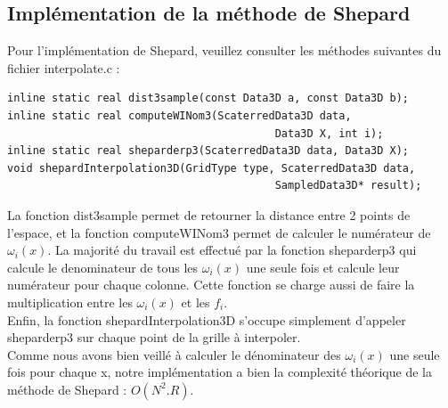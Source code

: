 \documentclass[a4paper,9pt]{article}
\begin{document}
\subsection{Implémentation de la méthode de Shepard}
\label{subsec:shepard_implementation}
Pour l'implémentation de Shepard, veuillez consulter les méthodes suivantes du fichier interpolate.c :
\begin{verbatim}
inline static real dist3sample(const Data3D a, const Data3D b);
inline static real computeWINom3(ScaterredData3D data, 
                                          Data3D X, int i);
inline static real sheparderp3(ScaterredData3D data, Data3D X);
void shepardInterpolation3D(GridType type, ScaterredData3D data,
                                          SampledData3D* result);
\end{verbatim}
La fonction dist3sample permet de retourner la distance entre 2 points de l'espace, et la fonction computeWINom3 permet de calculer le numérateur de $\omega_{i}(x)$. La majorité du travail est effectué par la fonction sheparderp3 qui calcule le denominateur de tous les $\omega_{i}(x)$ une seule fois et calcule leur numérateur pour chaque colonne. Cette fonction se charge aussi de faire la multiplication entre les $\omega_{i}(x)$ et les $f_{i}$.\\Enfin, la fonction shepardInterpolation3D s'occupe simplement d'appeler sheparderp3 sur chaque point de la grille à interpoler.\\Comme nous avons bien veillé à calculer le dénominateur des $\omega_{i}(x)$ une seule fois pour chaque x, notre implémentation a bien la complexité théorique de la méthode de Shepard : $O(N^{2}.R)$.
\end{document}
